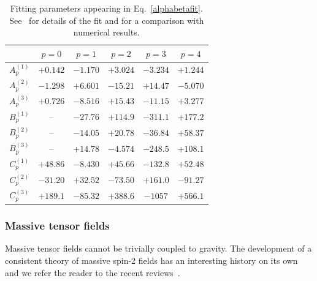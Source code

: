 \documentclass[11pt]{article}
\numberwithin{equation}{section} %
\begin{document}
\begin{table}
\centering
\caption{Fitting parameters appearing in Eq.~\eqref{alphabetafit}. See~\cite{Cardoso:2018tly} for 
details of the fit and for a comparison with numerical results.}\label{tab:fitProca}
 \begin{tabular}{cccccc}
  \hline
  \hline
  & $p=0$ & $p=1$ & $p=2$ & $p=3$& $p=4$\\
 \hline
  $A_p^{(1)}$ & $+0.142$ 	& $-1.170$	& $+3.024$	& $-3.234$	& $+1.244$ \\
  $A_p^{(2)}$ & $-1.298$ 	& $+6.601$	& $-15.21$	& $+14.47$	& $-5.070$ \\
  $A_p^{(3)}$ & $+0.726$ 	& $-8.516$	& $+15.43$	& $-11.15$	& $+3.277$   \\
  $B_p^{(1)}$ & -- 		& $-27.76$	& $+114.9$	& $-311.1$	& $+177.2$   \\
  $B_p^{(2)}$ & -- 		& $-14.05$ 	& $+20.78$	& $-36.84$	& $+58.37$  \\
  $B_p^{(3)}$ & -- 		& $+14.78$ 	& $-4.574$	& $-248.5$	& $+108.1$ \\
  $C_p^{(1)}$ & $+48.86$	& $-8.430$	& $+45.66$	& $-132.8$	& $+52.48$     \\
  $C_p^{(2)}$ & $-31.20$	& $+32.52$	& $-73.50$	& $+161.0$	& $-91.27$  \\
  $C_p^{(3)}$ & $+189.1$	& $-85.32$	& $+388.6$	& $-1057$	& $+566.1$       \\
  \hline
  \hline
  \end{tabular}
\end{table}

\subsubsection{Massive tensor fields\label{sec:spin2SR}} 
Massive tensor fields cannot be trivially coupled to gravity. The development of a consistent theory of massive spin-2 
fields has an interesting history on its own and we refer the reader to the recent 
reviews~\cite{Hinterbichler:2011tt,deRham:2014zqa}.
\end{document}

